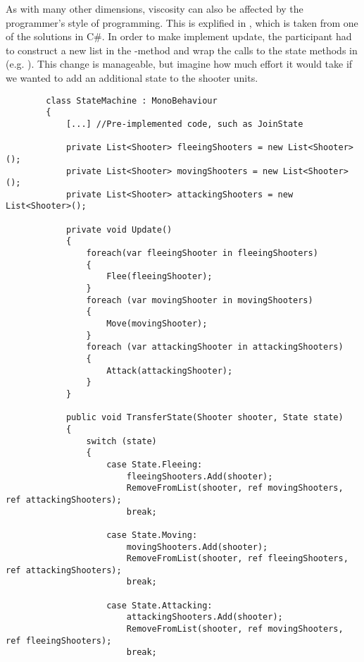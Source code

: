 As with many other dimensions, viscosity can also be affected by the programmer's style of programming. This is explified in , which is taken from one of the solutions in C\#. In order to make implement  update, the participant had to construct a new list in the -method and wrap the calls to the state methods in  (e.g. ). This change is manageable, but imagine how much effort it would take if we wanted to add an additional state to the shooter units. 

\begin{listing}
    \begin{verbatim}
        class StateMachine : MonoBehaviour
        {
            [...] //Pre-implemented code, such as JoinState

            private List<Shooter> fleeingShooters = new List<Shooter>();
            private List<Shooter> movingShooters = new List<Shooter>();
            private List<Shooter> attackingShooters = new List<Shooter>();
        
            private void Update()
            {
                foreach(var fleeingShooter in fleeingShooters)
                {
                    Flee(fleeingShooter);
                }
                foreach (var movingShooter in movingShooters)
                {
                    Move(movingShooter);
                }
                foreach (var attackingShooter in attackingShooters)
                {
                    Attack(attackingShooter);
                }
            }
        
            public void TransferState(Shooter shooter, State state)
            {
                switch (state)
                {
                    case State.Fleeing:
                        fleeingShooters.Add(shooter);
                        RemoveFromList(shooter, ref movingShooters, ref attackingShooters);
                        break;
        
                    case State.Moving:
                        movingShooters.Add(shooter);
                        RemoveFromList(shooter, ref fleeingShooters, ref attackingShooters);
                        break;
        
                    case State.Attacking:
                        attackingShooters.Add(shooter);
                        RemoveFromList(shooter, ref movingShooters, ref fleeingShooters);
                        break;
        

\end{verbatim}
\end{listing}

